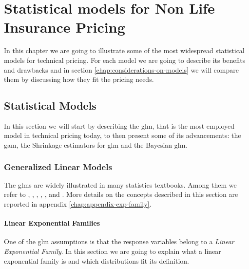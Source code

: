 \documentclass[a4paper, twoside, openright, 12pt]{report}
\theoremstyle{definition}
\theoremstyle{definition}
\theoremstyle{definition}
\theoremstyle{remark}
\begin{document}
\hypertarget{chap:models}{%
\chapter{Statistical models for Non Life Insurance Pricing}\label{chap:models}}

\minitoc  

In this chapter we are going to illustrate some of the most widespread statistical models for technical pricing. For each model we are going to describe its benefits and drawbacks and in section \ref{chap:considerations-on-models} we will compare them by discussing how they fit the pricing needs.

\hypertarget{statistical-models}{%
\section{Statistical Models}\label{statistical-models}}

In this section we will start by describing the \ac{glm}, that is the most employed model in technical pricing today, to then present some of its advancements: the \ac{gam}, the Shrinkage estimators for \ac{glm} and the Bayesian \ac{glm}.

\hypertarget{chap:glm}{%
\subsection{Generalized Linear Models}\label{chap:glm}}

The \ac{glm}s are widely illustrated in many statistics textbooks. Among them we refer to \autocite{wuthrich-data-analytics}, \autocite{gigante2010tariffazione}, \autocite{azzalini1996statistical}, \autocite{davison2003statistical}, \autocite{james2013introduction}, \autocite{friedman2001elements} and \autocite{portugues-predictive-modeling}. More details on the concepts described in this section are reported in appendix \ref{chap:appendix-exp-family}.

\hypertarget{chap:linear-exp-families}{%
\subsubsection{Linear Exponential Families}\label{chap:linear-exp-families}}

One of the \ac{glm} assumptions is that the response variables belong to a \emph{Linear Exponential Family}. In this section we are going to explain what a linear exponential family is and which distributions fit its definition.
\end{document}
